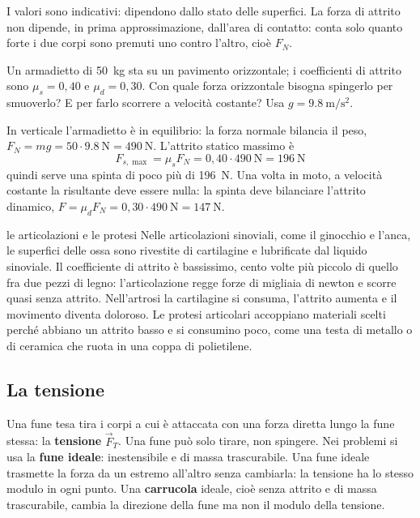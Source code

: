 I valori sono indicativi: dipendono dallo stato delle superfici. La forza di attrito non dipende, in prima approssimazione, dall'area di contatto: conta solo quanto forte i due corpi sono premuti uno contro l'altro, cioè $F_N$.

\begin{esempio}
Un armadietto di \SI{50}{\kilo\gram} sta su un pavimento orizzontale; i coefficienti di attrito sono $\mu_s = 0{,}40$ e $\mu_d = 0{,}30$. Con quale forza orizzontale bisogna spingerlo per smuoverlo? E per farlo scorrere a velocità costante? Usa $g = \SI{9,8}{\metre\per\second\squared}$.

In verticale l'armadietto è in equilibrio: la forza normale bilancia il peso, $F_N = mg = 50 \cdot \SI{9,8}{\newton} = \SI{490}{\newton}$. L'attrito statico massimo è
\[
  F_{s,\max} = \mu_s F_N = 0{,}40 \cdot \SI{490}{\newton} = \SI{196}{\newton}
\]
quindi serve una spinta di poco più di \SI{196}{\newton}. Una volta in moto, a velocità costante la risultante deve essere nulla: la spinta deve bilanciare l'attrito dinamico, $F = \mu_d F_N = 0{,}30 \cdot \SI{490}{\newton} = \SI{147}{\newton}$.
\end{esempio}

\begin{applicazione}{le articolazioni e le protesi}
Nelle articolazioni sinoviali, come il ginocchio e l'anca, le superfici delle ossa sono rivestite di cartilagine e lubrificate dal liquido sinoviale. Il coefficiente di attrito è bassissimo, cento volte più piccolo di quello fra due pezzi di legno: l'articolazione regge forze di migliaia di newton e scorre quasi senza attrito. Nell'artrosi la cartilagine si consuma, l'attrito aumenta e il movimento diventa doloroso. Le protesi articolari accoppiano materiali scelti perché abbiano un attrito basso e si consumino poco, come una testa di metallo o di ceramica che ruota in una coppa di polietilene.
\end{applicazione}

\subsection{La tensione}

Una fune tesa tira i corpi a cui è attaccata con una forza diretta lungo la fune stessa: la \textbf{tensione} $\vec F_T$. Una fune può solo tirare, non spingere. Nei problemi si usa la \textbf{fune ideale}: inestensibile e di massa trascurabile. Una fune ideale trasmette la forza da un estremo all'altro senza cambiarla: la tensione ha lo stesso modulo in ogni punto. Una \textbf{carrucola} ideale, cioè senza attrito e di massa trascurabile, cambia la direzione della fune ma non il modulo della tensione.

